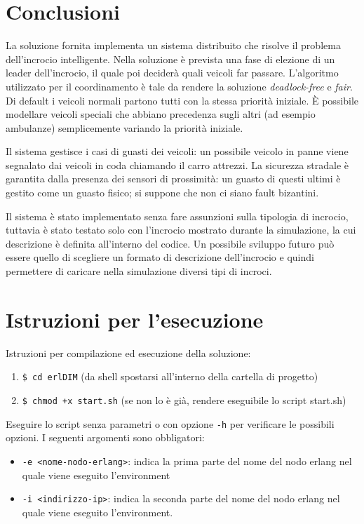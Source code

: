 \documentclass{memoir}
\begin{document}
\chapter{Conclusioni}
La soluzione fornita implementa un sistema distribuito che risolve il problema
dell'incrocio intelligente. Nella soluzione è prevista una fase di elezione di
un leader dell'incrocio, il quale poi deciderà quali veicoli far passare.
L'algoritmo utilizzato per il coordinamento è tale da rendere la soluzione
\emph{deadlock-free} e \emph{fair}. Di default i veicoli normali partono tutti
con la stessa priorità iniziale. È possibile modellare veicoli speciali che
abbiano precedenza sugli altri (ad esempio ambulanze) semplicemente variando la
priorità iniziale.

Il sistema gestisce i casi di guasti dei veicoli: un possibile veicolo in panne
viene segnalato dai veicoli in coda chiamando il carro attrezzi. La sicurezza
stradale è garantita dalla presenza dei sensori di prossimità: un guasto di
questi ultimi è gestito come un guasto fisico; si suppone che non ci siano fault
bizantini.

Il sistema è stato implementato senza fare assunzioni sulla tipologia di
incrocio, tuttavia è stato testato solo con l'incrocio mostrato durante la
simulazione, la cui descrizione è definita all'interno del codice. Un possibile
sviluppo futuro può essere quello di scegliere un formato di descrizione
dell'incrocio e quindi permettere di caricare nella simulazione diversi tipi di
incroci.

\appendix

\chapter{Istruzioni per l'esecuzione}

Istruzioni per compilazione ed esecuzione della soluzione:
\begin{enumerate}
\item \texttt{\$ cd erlDIM} (da shell spostarsi all'interno della cartella di
  progetto)
\item \texttt{\$ chmod +x start.sh} (se non lo è già, rendere eseguibile lo
  script start.sh)
\end{enumerate}
Eseguire lo script senza parametri o con opzione \texttt{-h} per verificare le
possibili opzioni. I seguenti argomenti sono obbligatori:
\begin{itemize}
\item \texttt{-e <nome-nodo-erlang>}: indica la prima parte del nome del nodo
  erlang nel quale viene eseguito l'environment
\item \texttt{-i <indirizzo-ip>}: indica la seconda parte del nome del nodo
  erlang nel quale viene eseguito l'environment.
\end{itemize}
\end{document}

